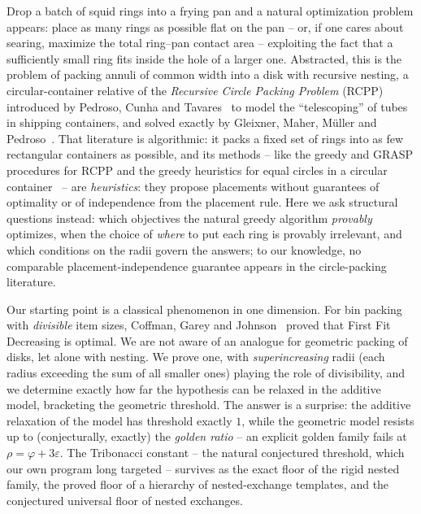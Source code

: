 \documentclass[11pt]{article}
\theoremstyle{definition}
\begin{document}
Drop a batch of squid rings into a frying pan and a natural optimization
problem appears: place as many rings as possible flat on the pan -- or, if one
cares about searing, maximize the total ring--pan contact area -- exploiting the
fact that a sufficiently small ring fits inside the hole of a larger one.
Abstracted, this is the problem of packing annuli of common width into a disk
with recursive nesting, a circular-container relative of the
\emph{Recursive Circle Packing Problem} (RCPP) introduced by Pedroso, Cunha and
Tavares~\cite{PedrosoCunhaTavares2016} to model the ``telescoping'' of tubes in
shipping containers, and solved exactly by Gleixner, Maher, M\"uller and
Pedroso~\cite{Gleixner2020}. That literature is algorithmic: it packs a fixed
set of rings into as few rectangular containers as possible, and its
methods -- like the greedy and GRASP procedures for RCPP and the greedy
heuristics for equal circles in a circular
container~\cite{PedrosoCunhaTavares2016,ChenEtAl2018} -- are
\emph{heuristics}: they propose placements without guarantees of
optimality or of independence from the placement rule. Here we ask
structural questions instead: which objectives the natural greedy
algorithm \emph{provably} optimizes, when the choice of \emph{where} to
put each ring is provably irrelevant, and which conditions on the radii
govern the answers; to our knowledge, no comparable
placement-independence guarantee appears in the circle-packing literature.

Our starting point is a classical phenomenon in one dimension. For bin packing
with \emph{divisible} item sizes, Coffman, Garey and
Johnson~\cite{CoffmanGareyJohnson1987} proved that First Fit Decreasing is
optimal. We are not aware of an analogue for geometric packing of disks, let
alone with nesting. We prove one, with \emph{superincreasing} radii (each radius exceeding
the sum of all smaller ones) playing the role of divisibility, and we
determine exactly how far the hypothesis can be relaxed in the additive
model, bracketing the geometric threshold. The answer is a
surprise: the additive relaxation of the model has threshold exactly $1$,
while the geometric model resists up to (conjecturally, exactly) the
\emph{golden ratio} -- an explicit golden family fails at
$\rho=\varphi+3\varepsilon$. The Tribonacci constant -- the natural
conjectured threshold, which our own program long targeted -- survives as
the exact floor of the rigid nested family, the proved floor of a
hierarchy of nested-exchange templates, and the conjectured universal
floor of nested exchanges.
\end{document}
